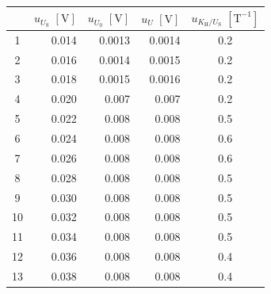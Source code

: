 \documentclass[a4paper]{article}
\begin{document}
\begin{table}[H]
	\centering
	\begin{tabular}{crrrc}
		\hline
		   & $u_{U_\text{S}}\,\,[\text{V}]$ & $u_{U_0}\,\,[\text{V}]$ & $u_U\,\,[\text{V}]$ & $u_{K_\text{H}/U_\text{S}}\,\,[\text{T}^{-1}]$ \\
		\hline
		1  & 0.014                          & 0.0013                  & 0.0014              & 0.2                                            \\
		2  & 0.016                          & 0.0014                  & 0.0015              & 0.2                                            \\
		3  & 0.018                          & 0.0015                  & 0.0016              & 0.2                                            \\
		4  & 0.020                          & 0.007                   & 0.007               & 0.2                                            \\
		5  & 0.022                          & 0.008                   & 0.008               & 0.5                                            \\
		6  & 0.024                          & 0.008                   & 0.008               & 0.6                                            \\
		7  & 0.026                          & 0.008                   & 0.008               & 0.6                                            \\
		8  & 0.028                          & 0.008                   & 0.008               & 0.5                                            \\
		9  & 0.030                          & 0.008                   & 0.008               & 0.5                                            \\
		10 & 0.032                          & 0.008                   & 0.008               & 0.5                                            \\
		11 & 0.034                          & 0.008                   & 0.008               & 0.5                                            \\
		12 & 0.036                          & 0.008                   & 0.008               & 0.4                                            \\
		13 & 0.038                          & 0.008                   & 0.008               & 0.4                                            \\

\end{tabular}
\end{table}
\end{document}
